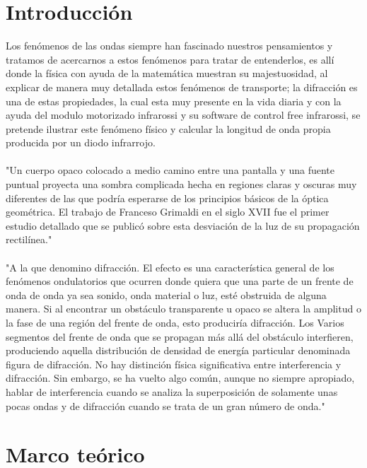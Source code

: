 \documentclass[12]{article}
\begin{document}
\begin{multicols}{2}
\section{Introducción}
Los fenómenos de las ondas siempre han fascinado nuestros pensamientos y tratamos de acercarnos a estos fenómenos para tratar de entenderlos, es allí donde la física con ayuda de la matemática muestran su majestuosidad, al explicar de manera muy detallada estos fenómenos de transporte; la difracción es una de estas propiedades, la cual esta muy presente en la vida diaria y con la ayuda del modulo motorizado infrarossi y su software de control free infrarossi, se pretende ilustrar este fenómeno físico y calcular la longitud de onda propia producida por un diodo infrarrojo.\\ \\
"Un cuerpo opaco colocado a medio camino entre una pantalla y una fuente puntual proyecta una sombra complicada hecha en regiones claras y oscuras muy diferentes de las que podría esperarse de los principios básicos de la óptica geométrica. El trabajo de Franceso Grimaldi en el siglo XVII fue el primer estudio detallado que se publicó sobre esta desviación de la luz de su propagación rectilínea."\cite{OPTICA} \\ \\
"A la que denomino difracción. El efecto es una característica general de los fenómenos ondulatorios que ocurren donde quiera que una parte de un frente de onda de onda ya sea sonido, onda material o luz, esté obstruida de alguna manera. Si al encontrar un obstáculo transparente u opaco se altera la amplitud o la fase de una región del frente de onda, esto produciría difracción. Los Varios segmentos del frente de onda que se propagan más allá del obstáculo interfieren, produciendo aquella distribución de densidad de energía particular denominada figura de difracción. No hay distinción física significativa entre interferencia y difracción. Sin embargo, se ha vuelto algo común, aunque no siempre apropiado, hablar de interferencia cuando se analiza la superposición de solamente unas pocas ondas y de difracción cuando se trata de un gran número de onda."\cite{OPTICA}


\section{Marco teórico}


\end{multicols}
\end{document}

